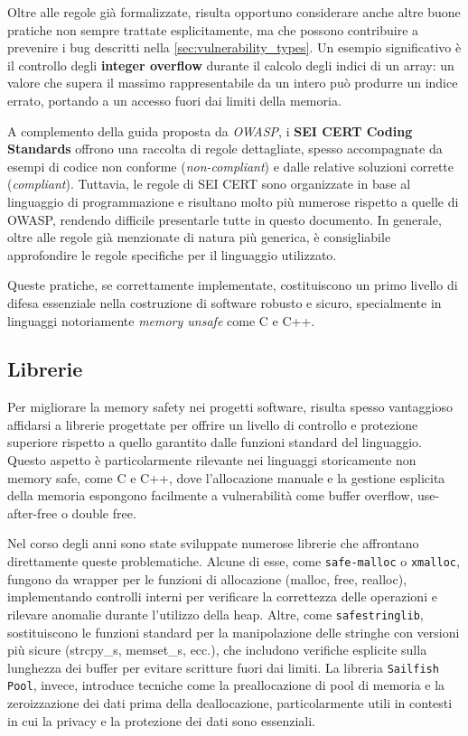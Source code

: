 Oltre alle regole già formalizzate, risulta opportuno considerare anche altre
buone pratiche non sempre trattate esplicitamente, ma che possono contribuire a prevenire
i bug descritti nella \autoref{sec:vulnerability_types}. Un esempio
significativo è il controllo degli \textbf{integer overflow} durante il calcolo degli
indici di un array: un valore che supera il massimo rappresentabile da un intero
può produrre un indice errato, portando a un accesso fuori dai limiti della memoria.

A complemento della guida proposta da \textit{OWASP}, i \textbf{SEI CERT Coding
Standards}\cite{cert_coding_standard} offrono una raccolta di regole dettagliate,
spesso accompagnate da esempi di codice non conforme (\textit{non-compliant}) e dalle
relative soluzioni corrette (\textit{compliant}). Tuttavia, le regole di SEI
CERT sono organizzate in base al linguaggio di programmazione e risultano molto
più numerose rispetto a quelle di OWASP, rendendo difficile presentarle tutte in
questo documento. In generale, oltre alle regole già menzionate di natura più generica,
è consigliabile approfondire le regole specifiche per il linguaggio utilizzato.

Queste pratiche, se correttamente implementate, costituiscono un primo livello
di difesa essenziale nella costruzione di software robusto e sicuro, specialmente
in linguaggi notoriamente \textit{memory unsafe} come C e C++.

\subsection{Librerie}
\label{sec:librerie}

Per migliorare la memory safety nei progetti software, risulta spesso
vantaggioso affidarsi a librerie progettate per offrire un livello di controllo
e protezione superiore rispetto a quello garantito dalle funzioni standard del
linguaggio. Questo aspetto è particolarmente rilevante nei linguaggi storicamente
non memory safe, come C e C++, dove l'allocazione manuale e la gestione esplicita
della memoria espongono facilmente a vulnerabilità come buffer overflow, use-after-free
o double free.

Nel corso degli anni sono state sviluppate numerose librerie che affrontano
direttamente queste problematiche. Alcune di esse, come \texttt{safe-malloc} o \texttt{xmalloc},
fungono da wrapper per le funzioni di allocazione (malloc, free, realloc),
implementando controlli interni per verificare la correttezza delle operazioni e
rilevare anomalie durante l'utilizzo della heap. Altre, come \texttt{safestringlib},
sostituiscono le funzioni standard per la manipolazione delle stringhe con
versioni più sicure (strcpy\_s, memset\_s, ecc.), che includono verifiche
esplicite sulla lunghezza dei buffer per evitare scritture fuori dai limiti. La libreria
\texttt{Sailfish Pool}, invece, introduce tecniche come la preallocazione di
pool di memoria e la zeroizzazione dei dati prima della deallocazione, particolarmente
utili in contesti in cui la privacy e la protezione dei dati sono essenziali.

